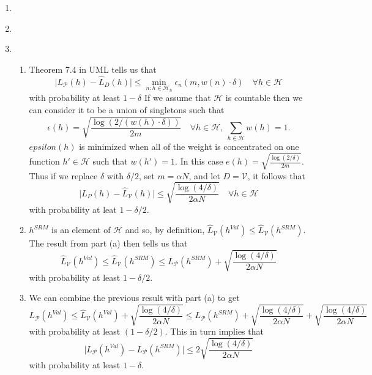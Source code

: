 \documentclass[11pt,letter]{article}
\begin{document}
\begin{enumerate}
    \item \
    \item \
    \item \begin{enumerate}
        \item Theorem 7.4 in UML tells us that 
        $$ \vert L_{\mathcal P}(h) - \hat L_D(h) \vert \le \min_{n:h \in \mathcal H_n} \epsilon_n(m, w(n) \cdot \delta) \quad \forall h \in \mathcal H$$ 
        with probability at least $1 - \delta$
        If we assume that $\mathcal H$ is countable then we can consider it to be a union of singletons such that 
        $$\epsilon(h) = \sqrt{\frac{\log(2/(w(h) \cdot \delta))}{2m}} \quad \forall h \in \mathcal H, \ \sum_{h \in \mathcal H} w(h) = 1.$$
        $epsilon(h)$ is minimized when all of the weight is concentrated on one function $h' \in \mathcal H$ such that $w(h') = 1$.
        In this case $e(h) = \sqrt{\frac{\log(2/\delta)}{2m}}$.
        Thus if we replace $\delta$ with $\delta/2$, set $m = \alpha N$, and let $D = \mathcal V$, it follows that
        $$ \vert L_P(h) - \hat L_{\mathcal V}(h) \vert \le \sqrt{\frac{\log(4/\delta)}{2\alpha N}} \quad \forall h \in \mathcal H$$
        with probability at leat $1 - \delta/2$.
        
        \item $h^{SRM}$ is an element of $\mathcal H$ and so, by definition, $\hat L_{\mathcal V} (h^{Val}) \le \hat L_{\mathcal V} (h^{SRM})$. The result from part (a) then tells us that
        $$ \hat L_{\mathcal V} (h^{Val}) \le \hat L_{\mathcal V} (h^{SRM}) \le L_{\mathcal P} (h^{SRM}) + \sqrt{\frac{\log(4/\delta)}{2\alpha N}} $$
        with probability at least $1 - \delta/2$.

        \item We can combine the previous result with part (a) to get 
        $$ L_{\mathcal P} (h^{Val}) \le \hat L_{\mathcal V} (h^{Val}) + \sqrt{\frac{\log(4/\delta)}{2\alpha N}} \le L_{\mathcal P} (h^{SRM}) + \sqrt{\frac{\log(4/\delta)}{2\alpha N}} + \sqrt{\frac{\log(4/\delta)}{2\alpha N}} $$
        with probability at least $(1-\delta/2)$. This in turn implies that
        $$ \big\vert L_{\mathcal P} (h^{Val}) - L_{\mathcal P} (h^{SRM}) \big\vert \le 2\sqrt{\frac{\log(4/\delta)}{2\alpha N}} $$
        with probability at least $1 - \delta$. 
    \end{enumerate}
\end{enumerate}
\end{document}
